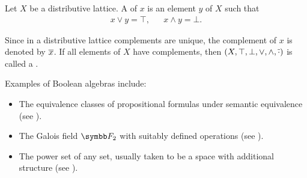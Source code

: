 \begin{definition}\label{def:boolean_algebra}\cite{nLab:boolean_algebra}
  Let \( X \) be a distributive lattice. A  of \( x \) is an element \( y \) of \( X \) such that
  \begin{align*}
    x \vee y = \top, && x \wedge y = \bot.
  \end{align*}

  Since in a distributive lattice complements are unique, the complement of \( x \) is denoted by \( \overline{x} \). If all elements of \( X \) have complements, then \( (X, \top, \bot, \vee, \wedge, \overline{\cdot}) \) is called a .
\end{definition}

\begin{example}\label{ex:categories}
  Examples of Boolean algebras include:

  \begin{itemize}
    \item The equivalence classes of propositional formulas under semantic equivalence (see ).
    \item The Galois field \( \BF_2 \) with suitably defined operations (see ).
    \item The power set of any set, usually taken to be a space with additional structure (see ).
  \end{itemize}
\end{example}

